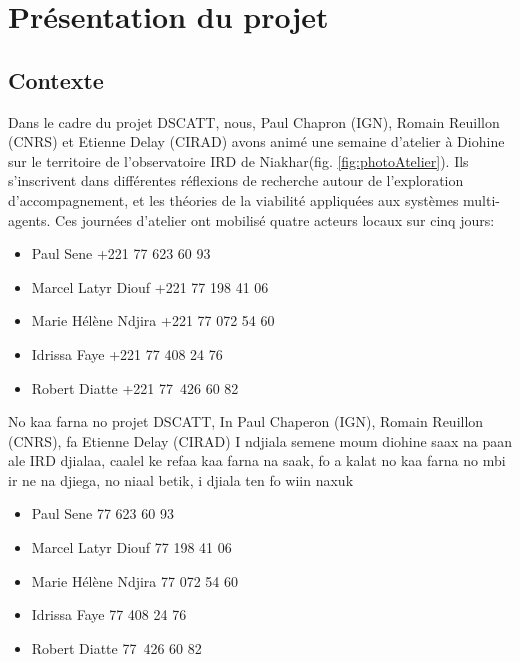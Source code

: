 \chapter{Présentation du projet}


\section{Contexte}
\begin{paracol}{2}%
  Dans le cadre du projet DSCATT, nous, Paul Chapron (IGN), Romain Reuillon (CNRS) et Etienne Delay (CIRAD) avons animé une semaine d'atelier à Diohine sur le territoire de l'observatoire IRD de Niakhar(fig. \ref{fig:photoAtelier}). Ils s'inscrivent dans différentes réflexions de recherche autour de l'exploration\\
  d'accompagnement, et les théories de la viabilité appliquées aux systèmes multi-agents.
  Ces journées d'atelier ont mobilisé quatre acteurs locaux sur cinq jours:
  \begin{itemize}
    \item Paul Sene +221 77 623 60 93
    \item Marcel Latyr Diouf +221 77 198 41 06
    \item Marie Hélène Ndjira +221 77 072 54 60
    \item Idrissa Faye +221 77 408 24 76
    \item Robert Diatte +221 77 426 60 82
  \end{itemize}

\switchcolumn %
  No kaa farna no projet DSCATT, In Paul Chaperon (IGN), Romain Reuillon (CNRS), fa Etienne Delay (CIRAD) I ndjiala semene moum diohine saax na paan ale IRD djialaa, caalel ke refaa kaa farna na saak, fo a kalat no kaa farna no mbi ir ne na djiega, no niaal betik, i djiala ten fo wiin naxuk

  \begin{itemize}
    \item Paul Sene 77 623 60 93
    \item Marcel Latyr Diouf 77 198 41 06
    \item Marie Hélène Ndjira 77 072 54 60
    \item Idrissa Faye 77 408 24 76
    \item Robert Diatte 77 426 60 82
  \end{itemize}
\end{paracol}

